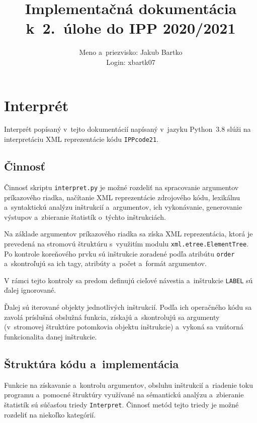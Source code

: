 \documentclass[a4paper, 10pt, twocolumn]{article}
\title{Implementačná dokumentácia k~2.~úlohe do IPP 2020/2021}
\author{Meno a~priezvisko: Jakub Bartko \\ Login: xbartk07}
\date{}
\begin{document}
\maketitle

\section{Interprét}
    Interprét popísaný v~tejto dokumentácií napísaný v~jazyku Python~3.8 slúži na interpretáciu XML reprezentácie kódu \texttt{IPPcode21}.
    
    \subsection{Činnosť}\label{sub:cinnost}
        Činnosť skriptu \texttt{interpret.py} je možné rozdeliť na spracovanie argumentov príkazového riadka, načítanie XML reprezentácie zdrojového kódu, lexikálnu a~syntaktickú analýzu inštrukcií a~argumentov, ich vykonávanie, generovanie výstupov a~zbieranie štatistík o~týchto inštrukciách.
        
        Na základe argumentov príkazového riadka sa získa XML reprezentácia, ktorá je prevedená na stromovú štruktúru s~využitím modulu \texttt{xml.etree.ElementTree}. Po kontrole koreňového prvku sú inštrukcie zoradené podľa atribútu \texttt{order} a~skontroľujú sa ich tagy, atribúty a~počet a~formát argumentov. 
        
        \label{sub:label}V rámci tejto kontroly sa predom definujú cieľové návestia a~inštrukcie \texttt{LABEL} sú ďalej ignorované.
        
        Ďalej sú iterované objekty jednotlivých inštrukcií. Podľa ich operačného kódu sa zavolá príslušná obslužná funkcia, získajú a~skontrolujú sa argumenty (v~stromovej štruktúre potomkovia objektu inštrukcie) a~vykoná sa vnútorná funkcionalita danej inštrukcie.
    
    \subsection{Štruktúra kódu a~implementácia}\label{sub:struct}
        Funkcie na získavanie a~kontrolu argumentov, obsluhu inštrukcií a~riadenie toku programu a~pomocné štruktúry využívané na sémantickú analýzu a~zbieranie štatistík sú súčasťou triedy \texttt{Interpret}. Činnosť metód tejto triedy je možné rozdeliť na niekoľko kategórií.
        
\end{document}
